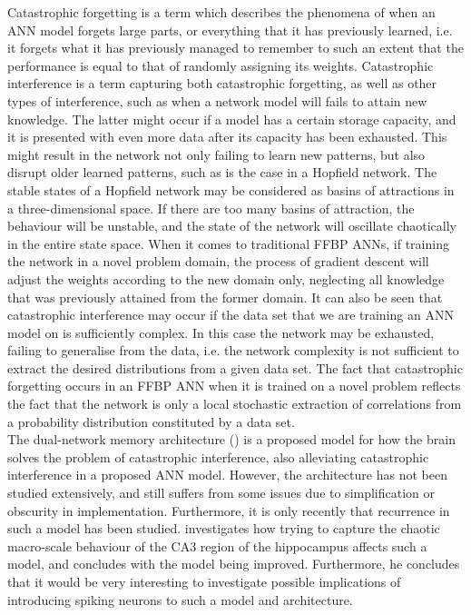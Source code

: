 Catastrophic forgetting \cite{McCloskey1989} is a term which describes the phenomena of when an ANN model forgets large parts, or everything that it has previously learned, i.e. it forgets what it has previously managed to remember to such an extent that the performance is equal to that of randomly assigning its weights. Catastrophic interference is a term capturing both catastrophic forgetting, as well as other types of interference, such as when a network model will fails to attain new knowledge. The latter might occur if a model has a certain storage capacity, and it is presented with even more data after its capacity has been exhausted. This might result in the network not only failing to learn new patterns, but also disrupt older learned patterns, such as is the case in a Hopfield network. The stable states of a Hopfield network may be considered as basins of attractions in a three-dimensional space. If there are too many basins of attraction, the behaviour will be unstable, and the state of the network will oscillate chaotically in the entire state space.
When it comes to traditional FFBP ANNs, if training the network in a novel problem domain, the process of gradient descent will adjust the weights according to the new domain only, neglecting all knowledge that was previously attained from the former domain.
It can also be seen that catastrophic interference may occur if the data set that we are training an ANN model on is sufficiently complex. In this case the network may be exhausted, failing to generalise from the data, i.e. the network complexity is not sufficient to extract the desired distributions from a given data set. 
The fact that catastrophic forgetting occurs in an FFBP ANN when it is trained on a novel problem reflects the fact that the network is only a local stochastic extraction of correlations from a probability distribution constituted by a data set.
\\

The dual-network memory architecture (\cite{McClelland1995}) is a proposed model for how the brain solves the problem of catastrophic interference, also alleviating catastrophic interference in a proposed ANN model. However, the architecture has not been studied extensively, and still suffers from some issues due to simplification or obscurity in implementation. Furthermore, it is only recently that recurrence in such a model has been studied. \cite{Hattori2014} investigates how trying to capture the chaotic macro-scale behaviour of the CA3 region of the hippocampus affects such a model, and concludes with the model being improved. Furthermore, he concludes that it would be very interesting to investigate possible implications of introducing spiking neurons to such a model and architecture.
\\

